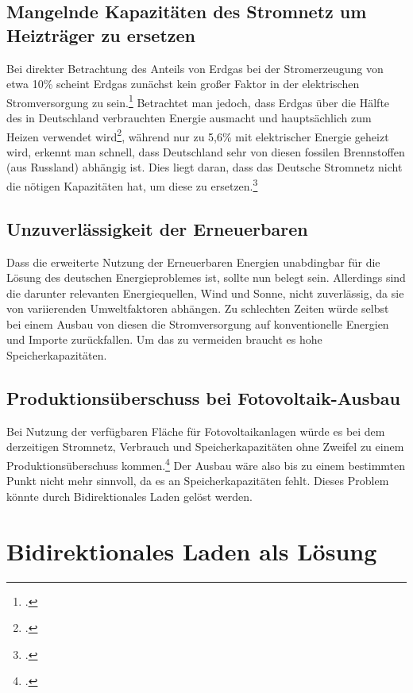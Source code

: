 \documentclass[12pt]{article}
\begin{document}
\subsection{Mangelnde Kapazitäten des Stromnetz um Heizträger zu ersetzen}
Bei direkter Betrachtung des Anteils von Erdgas bei der Stromerzeugung von etwa 10\% scheint Erdgas zunächst
kein großer Faktor in der elektrischen Stromversorgung zu sein.\footcite{SMARDHoherEEAnteil,EnergieWofuerErdgas}
Betrachtet man jedoch, dass Erdgas über die Hälfte des in Deutschland verbrauchten
Energie ausmacht und hauptsächlich zum Heizen verwendet wird\footcite{Anwendungsbereiche,EnergieWofuerErdgas},
während nur zu 5,6\% mit elektrischer Energie geheizt wird, erkennt man schnell, dass Deutschland sehr von diesen
fossilen Brennstoffen (aus Russland) abhängig ist.
Dies liegt daran, dass das Deutsche Stromnetz nicht die nötigen Kapazitäten hat, um diese zu
ersetzen.\footcite{EnergieWofuerErdgas}



\subsection{Unzuverlässigkeit der Erneuerbaren}
Dass die erweiterte Nutzung der Erneuerbaren Energien unabdingbar für die Lösung des deutschen Energieproblemes
ist, sollte nun belegt sein. Allerdings sind die darunter relevanten Energiequellen, Wind und Sonne, nicht
zuverlässig, da sie von variierenden Umweltfaktoren abhängen. Zu schlechten Zeiten würde selbst bei einem Ausbau
von diesen die Stromversorgung auf konventionelle Energien und Importe zurückfallen. Um das zu vermeiden braucht
es hohe Speicherkapazitäten.

\subsection{Produktionsüberschuss bei Fotovoltaik-Ausbau}
Bei Nutzung der verfügbaren Fläche für Fotovoltaikanlagen würde es bei dem derzeitigen Stromnetz, Verbrauch und
Speicherkapazitäten ohne Zweifel zu einem Produktionsüberschuss kommen.\footcite{wirthAktuelleFaktenZur}
Der Ausbau wäre also bis zu einem bestimmten Punkt nicht mehr sinnvoll, da es an Speicherkapazitäten fehlt.
Dieses Problem könnte durch Bidirektionales Laden gelöst werden.


\section{Bidirektionales Laden als Lösung}
\end{document}
